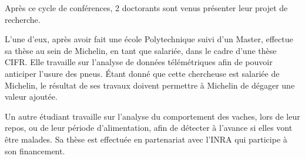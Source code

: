 \documentclass[14pt, a4paper]{report}
\begin{document}
Après ce cycle de conférences, 2 doctorants sont venus présenter leur projet de recherche.

L'une d'eux, après avoir fait une école Polytechnique suivi d'un Master, effectue sa thèse au sein de Michelin, en tant que salariée, dans le cadre d'une thèse CIFR. Elle travaille sur l'analyse de données télémétriques afin de pouvoir anticiper l'usure des pneus. Étant donné que cette chercheuse est salariée de Michelin, le résultat de ses travaux doivent permettre à Michelin de dégager une valeur ajoutée.

Un autre étudiant travaille sur l'analyse du comportement des vaches, lors de leur repos, ou de leur période d'alimentation, afin de détecter à l'avance si elles vont être malades. Sa thèse est effectuée en partenariat avec l'INRA qui participe à son financement.
\end{document}
